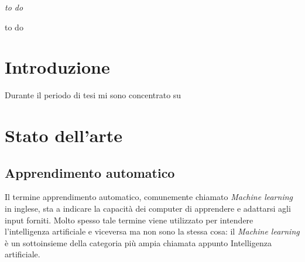 \documentclass[12pt,italian]{report}
\begin{document}
	
	\frontespizio
	\beforepreface
	
	
	{\raggedleft \large \sl to do\\
		
	}
	
	
	
	
	
	
	
	to do
	
	
	\afterpreface
	
	
	
	\chapter*{Introduzione}
	\label{cap:introduzione}
	Durante il periodo di tesi mi sono concentrato su
	
	\chapter{Stato dell'arte}
	
	\section{Apprendimento automatico}
	Il termine apprendimento automatico, comunemente chiamato \textit{Machine learning} in inglese, sta a indicare la capacità dei computer di apprendere e adattarsi agli input forniti.
	Molto spesso tale termine viene utilizzato per intendere l'intelligenza artificiale e viceversa ma non sono la stessa cosa: il \textit{Machine learning} è un sottoinsieme della categoria più ampia chiamata appunto Intelligenza artificiale.
 
\end{document}
